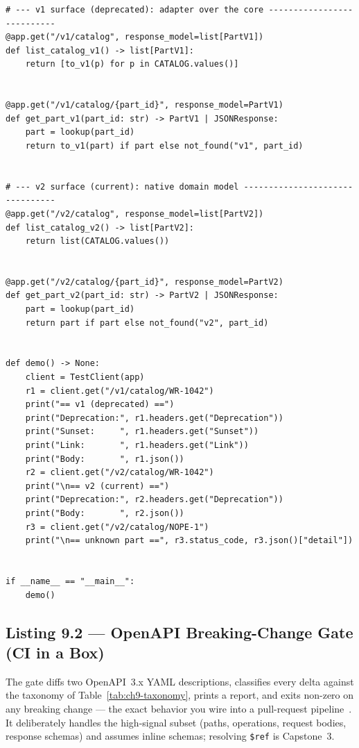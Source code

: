 \begin{verbatim}
# --- v1 surface (deprecated): adapter over the core ---------------------------
@app.get("/v1/catalog", response_model=list[PartV1])
def list_catalog_v1() -> list[PartV1]:
    return [to_v1(p) for p in CATALOG.values()]


@app.get("/v1/catalog/{part_id}", response_model=PartV1)
def get_part_v1(part_id: str) -> PartV1 | JSONResponse:
    part = lookup(part_id)
    return to_v1(part) if part else not_found("v1", part_id)


# --- v2 surface (current): native domain model --------------------------------
@app.get("/v2/catalog", response_model=list[PartV2])
def list_catalog_v2() -> list[PartV2]:
    return list(CATALOG.values())


@app.get("/v2/catalog/{part_id}", response_model=PartV2)
def get_part_v2(part_id: str) -> PartV2 | JSONResponse:
    part = lookup(part_id)
    return part if part else not_found("v2", part_id)


def demo() -> None:
    client = TestClient(app)
    r1 = client.get("/v1/catalog/WR-1042")
    print("== v1 (deprecated) ==")
    print("Deprecation:", r1.headers.get("Deprecation"))
    print("Sunset:     ", r1.headers.get("Sunset"))
    print("Link:       ", r1.headers.get("Link"))
    print("Body:       ", r1.json())
    r2 = client.get("/v2/catalog/WR-1042")
    print("\n== v2 (current) ==")
    print("Deprecation:", r2.headers.get("Deprecation"))
    print("Body:       ", r2.json())
    r3 = client.get("/v2/catalog/NOPE-1")
    print("\n== unknown part ==", r3.status_code, r3.json()["detail"])


if __name__ == "__main__":
    demo()
\end{verbatim}

\subsection{Listing 9.2 --- OpenAPI Breaking-Change Gate (CI in a Box)}
\label{subsec:ch9-listing2}

The gate diffs two OpenAPI~3.x YAML descriptions, classifies every delta
against the taxonomy of Table~\ref{tab:ch9-taxonomy}, prints a report, and
exits non-zero on any breaking change --- the exact behavior you wire into a
pull-request pipeline~\cite{openapi31}. It deliberately handles the
high-signal subset (paths, operations, request bodies, response schemas) and
assumes inline schemas; resolving \texttt{\$ref} is Capstone~3.

